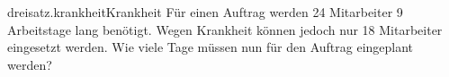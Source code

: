 \begin{exercise}{dreisatz.krankheit}{Krankheit}
  \ifproblem\problem
    Für einen Auftrag werden 24 Mitarbeiter 9 Arbeitstage lang benötigt. Wegen
    Krankheit können jedoch nur 18 Mitarbeiter eingesetzt werden. Wie viele
    Tage müssen nun für den Auftrag eingeplant werden?
  \fi
\end{exercise}
